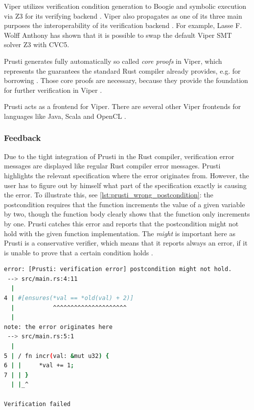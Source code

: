 Viper utilizes verification condition generation to Boogie and symbolic execution via Z3 for its verifying backend \cite{jobstmann_viper_2016}. Viper also propagates as one of its three main purposes the interoperability of its verification backend \cite{jobstmann_viper_2016}. For example, Lasse F. Wolff Anthony has shown \cite{anthony_supporting_2022} that it is possible to swap the default Viper SMT solver Z3 with CVC5.

Prusti generates fully automatically so called \textit{core proofs} in Viper, which represents the guarantees the standard Rust compiler already provides, e.g. for borrowing \cite{astrauskas_leveraging_2019}. Those core proofs are necessary, because they provide the foundation for further verification in Viper \cite{astrauskas_leveraging_2019}.

Prusti acts as a frontend for Viper. There are several other Viper frontends for languages like Java, Scala and OpenCL \cite{jobstmann_viper_2016}.

\subsubsection{Feedback}
\label{cap:prusti_feedback}
Due to the tight integration of Prusti in the Rust compiler, verification error messages are displayed like regular Rust compiler error messages. Prusti highlights the relevant specification where the error originates from. However, the user has to figure out by himself what part of the specification exactly is causing the error. To illustrate this, see \autoref{lst:prusti_wrong_postcondition}: the postcondition requires that the function increments the value of a given variable by two, though the function body clearly shows that the function only increments by one. Prusti catches this error and reports that the postcondition might not hold with the given function implementation. The \textit{might} is important here as Prusti is a conservative verifier, which means that it reports always an error, if it is unable to prove that a certain condition holds \cite{prusti_user_guide_absence_2023}.

\begin{lstlisting}[language=bash, caption=Example output of a verification error in Prusti, label={lst:prusti_wrong_postcondition}]
error: [Prusti: verification error] postcondition might not hold.
 --> src/main.rs:4:11
  |
4 | #[ensures(*val == *old(val) + 2)]
  |           ^^^^^^^^^^^^^^^^^^^^^
  |
note: the error originates here
 --> src/main.rs:5:1
  |
5 | / fn incr(val: &mut u32) {
6 | |     *val += 1;
7 | | }
  | |_^

Verification failed
\end{lstlisting}

